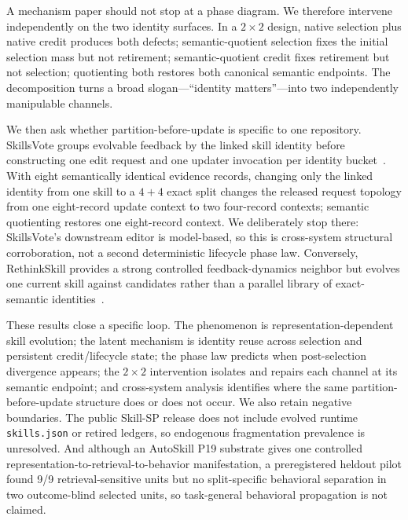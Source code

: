 A mechanism paper should not stop at a phase diagram. We therefore intervene independently on the two identity surfaces. In a $2\times2$ design, native selection plus native credit produces both defects; semantic-quotient selection fixes the initial selection mass but not retirement; semantic-quotient credit fixes retirement but not selection; quotienting both restores both canonical semantic endpoints. The decomposition turns a broad slogan---``identity matters''---into two independently manipulable channels.

We then ask whether partition-before-update is specific to one repository. SkillsVote groups evolvable feedback by the linked skill identity before constructing one edit request and one updater invocation per identity bucket~\citep{liu2026skillsvote}. With eight semantically identical evidence records, changing only the linked identity from one skill to a $4+4$ exact split changes the released request topology from one eight-record update context to two four-record contexts; semantic quotienting restores one eight-record context. We deliberately stop there: SkillsVote's downstream editor is model-based, so this is cross-system structural corroboration, not a second deterministic lifecycle phase law. Conversely, RethinkSkill provides a strong controlled feedback-dynamics neighbor but evolves one current skill against candidates rather than a parallel library of exact-semantic identities~\citep{liu2026rethinkskill}.

These results close a specific loop. The phenomenon is representation-dependent skill evolution; the latent mechanism is identity reuse across selection and persistent credit/lifecycle state; the phase law predicts when post-selection divergence appears; the $2\times2$ intervention isolates and repairs each channel at its semantic endpoint; and cross-system analysis identifies where the same partition-before-update structure does or does not occur. We also retain negative boundaries. The public Skill-SP release does not include evolved runtime \texttt{skills.json} or retired ledgers, so endogenous fragmentation prevalence is unresolved. And although an AutoSkill P19 substrate gives one controlled representation-to-retrieval-to-behavior manifestation, a preregistered heldout pilot found 9/9 retrieval-sensitive units but no split-specific behavioral separation in two outcome-blind selected units, so task-general behavioral propagation is not claimed.

